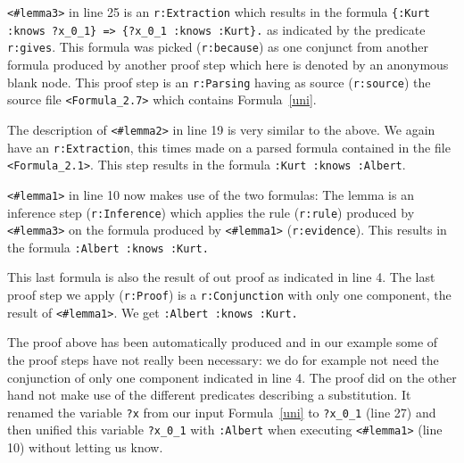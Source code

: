 \texttt{<\#lemma3>} in line 25 is an \texttt{r:Extraction} which results in the formula
\texttt{\{:Kurt :knows ?x\_0\_1\} => \{?x\_0\_1 :knows :Kurt\}.} as indicated by the predicate \texttt{r:gives}.
This formula was picked (\texttt{r:because}) as one conjunct from another formula produced by another proof step which here is denoted by an anonymous blank node. 
This proof step is an \texttt{r:Parsing}  
having as source  (\texttt{r:source})  the source file \texttt{<Formula\_2.7>} which  contains Formula~\ref{uni}.

The description of \texttt{<\#lemma2>} in line 19 is very similar to the above. We again have an \texttt{r:Extraction}, 
this times made on a parsed formula contained in the file \texttt{<Formula\_2.1>}. This step results in the formula \texttt{:Kurt :knows :Albert}.

\texttt{<\#lemma1>} in line 10 now makes use of the two formulas: The lemma is an inference step (\texttt{r:Inference}) which applies the rule (\texttt{r:rule})
produced by \texttt{<\#lemma3>} on the formula produced by \texttt{<\#lemma1>} (\texttt{r:evidence}). This results in the formula \texttt{:Albert :knows :Kurt.}

This last formula is also the result of out proof as indicated in line 4. The last proof step we apply (\texttt{r:Proof}) is a \texttt{r:Conjunction} with only one component, the 
result of \texttt{<\#lemma1>}. We get \texttt{:Albert :knows :Kurt.}




The proof above has been automatically produced and in our example some of the proof steps have not really been necessary: 
we do for example not need the conjunction of only one component indicated in line 4. The proof did on the other hand not make use of the different predicates describing a substitution. 
It renamed the variable \texttt{?x} from our input Formula~\ref{uni} to \texttt{?x\_0\_1} (line 27) and then unified this variable \texttt{?x\_0\_1} with \texttt{:Albert} when executing 
\texttt{<\#lemma1>} (line 10) without letting us know. 


